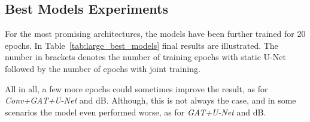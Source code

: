 \subsection{Best Models Experiments}
For the most promising architectures, the models have been further trained for 20 epochs. 
In Table~\ref{tab:large_best_models} final results are illustrated. 
The number in brackets denotes the number of training epochs with static U-Net followed by
the number of epochs with joint training.

All in all, a few more epochs could sometimes improve the result, as for \textit{Conv+GAT+U-Net} and  dB.
Although, this is not always the case, and in some scenarios the model even performed worse, as for 
\textit{GAT+U-Net} and  dB.


\begin{table}[H]
  \centering
  \caption{Large Scale Experiment: Baseline results.}
  \label{tab:large_best_models}
\end{table}

